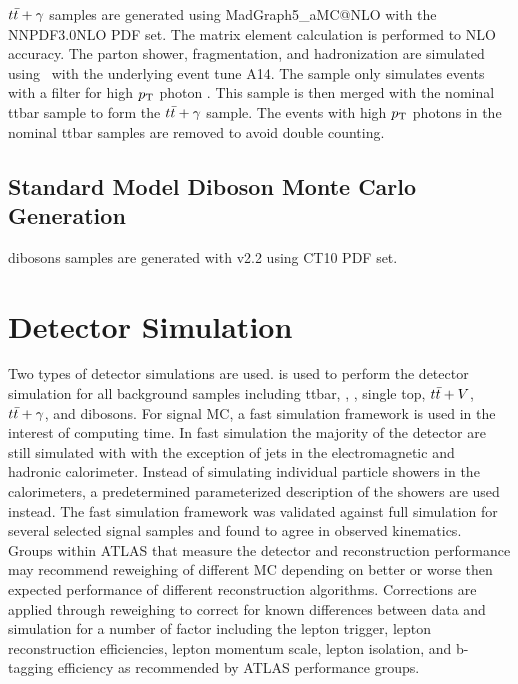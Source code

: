 \indent $t\bar{t}+\gamma$ samples are generated using {\sc MadGraph5\_aMC\/@NLO} with the NNPDF3.0NLO PDF set. The matrix element calculation is performed to NLO accuracy. The parton shower, fragmentation, and hadronization are simulated using \pythiaeight\ with the underlying event tune A14.  The sample only simulates events with a filter for high $p_{\mathrm{T}}$ photon .  This sample is then merged with the nominal ttbar sample to form the $t\bar{t}+\gamma$ sample.  The events with high $p_{\mathrm{T}}$ photons in the nominal ttbar samples are removed to avoid double counting. \\

\subsection{Standard Model Diboson Monte Carlo Generation}

\indent dibosons samples are generated with \sherpa v2.2 using CT10 PDF set. \\

\section{Detector Simulation}
\label{sec:MC:DET}

\indent Two types of detector simulations are used.   \cite{Geant} is used to perform the detector simulation for all background samples including ttbar, \Wjets, \Zjets, single top, $t\bar{t}+V$, $t\bar{t}+\gamma$, and dibosons.  For signal MC, a fast simulation framework is used in the interest of computing time.  In fast simulation the majority of the detector are still simulated with  with the exception of jets in the electromagnetic and hadronic calorimeter.  Instead of simulating individual particle showers in the calorimeters, a predetermined parameterized description of the showers are used instead.  The fast simulation framework was validated against full  simulation for several selected signal samples and found to agree in observed kinematics.  \\

\indent Groups within ATLAS that measure the detector and reconstruction performance may recommend reweighing of different MC depending on better or worse then expected performance of different reconstruction algorithms. Corrections are applied through reweighing to correct for known differences between data and simulation for a number of factor including the lepton trigger, lepton reconstruction efficiencies, lepton momentum scale, lepton isolation, and b-tagging efficiency as recommended by ATLAS performance groups. \\

